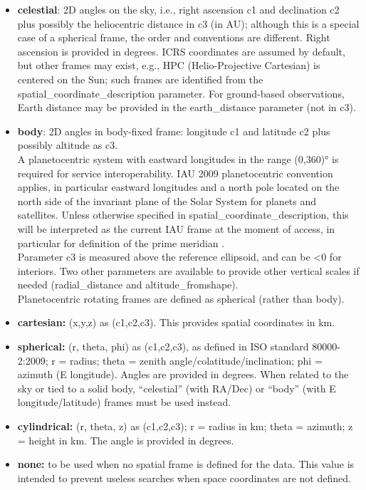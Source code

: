 \documentclass[11pt,a4paper]{ivoa}
\begin{document}
\begin{itemize}
\item \textbf{celestial}: 2D angles on the sky, i.e., right ascension
c1 and declination c2 plus possibly the heliocentric distance in c3 (in AU);
although this is a special case of a spherical frame, the order and
conventions are different. Right ascension is provided in degrees. ICRS
coordinates are assumed by default, but other frames may exist, e.g., HPC
(Helio-Projective Cartesian) is centered on the Sun; such frames are
identified from the spatial\_coordinate\_description parameter.
For ground-based observations, Earth distance may be provided in the
earth\_distance parameter (not in c3).

\item \textbf{body}: 2D angles in body-fixed frame: longitude c1 and
latitude c2 plus possibly altitude as c3. \\A planetocentric system with
eastward longitudes in the range (0,360)° is required for service
interoperability. IAU 2009 planetocentric convention
applies, in particular eastward longitudes and a north pole located on
the north side of the invariant plane of the Solar System for planets
and satellites.
Unless otherwise specified in spatial\_coordinate\_description,
this will be interpreted as the current IAU frame at the moment of access,
in particular for definition of the prime meridian \citep{2018CeMDA.130...22A}.
\\Parameter c3 is measured above the reference
ellipsoid, and can be <0 for interiors. Two other parameters are
available to provide other vertical scales if needed (radial\_distance
and altitude\_fromshape). \\Planetocentric rotating frames are defined
as spherical (rather than body).

\item \textbf{cartesian:} (x,y,z) as (c1,c2,c3).
This provides spatial coordinates  in km.

\item \textbf{spherical:} (r, theta, phi) as (c1,c2,c3), as
defined in ISO standard 80000-2:2009; r = radius; theta = zenith
angle/colatitude/inclination; phi = azimuth (E longitude). Angles are
provided in degrees. When related to the sky or tied to a solid body,
``celestial'' (with RA/Dec) or ``body'' (with E longitude/latitude)
frames must be used instead.

\item \textbf{cylindrical:} (r, theta, z) as (c1,c2,c3); r = radius in
km; theta = azimuth; z = height in km. The angle is provided in degrees.

\item \textbf{none:} to be used when no spatial frame is defined for
the data. This value is intended to prevent useless searches when space
coordinates are not defined.

\end{itemize}
\end{document}
